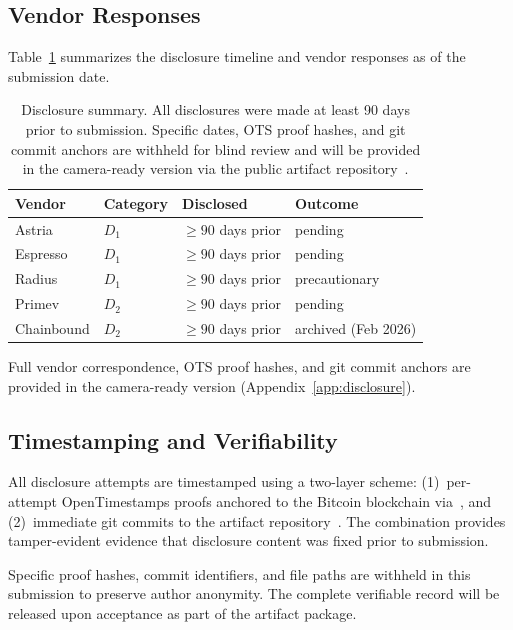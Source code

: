 \subsection{Vendor Responses}
\label{sec:disclosure-responses}

Table~\ref{tab:vendor-responses} summarizes the disclosure timeline and
vendor responses as of the submission date.

\begin{table}[h]
\centering
\small
\caption{Disclosure summary.
  All disclosures were made at least 90 days prior to submission.
  Specific dates, OTS proof hashes, and git commit anchors are
  withheld for blind review and will be provided in the camera-ready version
  via the public artifact repository~\cite{artifact-repo}.}
\label{tab:vendor-responses}
\begin{tabular}{@{}llll@{}}
\toprule
Vendor & Category & Disclosed & Outcome \\
\midrule
Astria       & $D_1$ & $\geq 90$ days prior & pending \\
Espresso     & $D_1$ & $\geq 90$ days prior & pending \\
Radius       & $D_1$ & $\geq 90$ days prior & precautionary \\
Primev       & $D_2$ & $\geq 90$ days prior & pending \\
Chainbound   & $D_2$ & $\geq 90$ days prior & archived (Feb 2026) \\
\bottomrule
\end{tabular}
\end{table}

\noindent Full vendor correspondence, OTS proof hashes, and git commit
anchors are provided in the camera-ready version (Appendix~\ref{app:disclosure}).

\subsection{Timestamping and Verifiability}
\label{sec:disclosure-timestamps}

All disclosure attempts are timestamped using a two-layer scheme:
(1)~per-attempt OpenTimestamps proofs anchored to the Bitcoin blockchain
via~\cite{opentimestamps}, and (2)~immediate git commits to the artifact
repository~\cite{artifact-repo}. The combination provides tamper-evident
evidence that disclosure content was fixed prior to submission.

Specific proof hashes, commit identifiers, and file paths are withheld
in this submission to preserve author anonymity. The complete verifiable
record will be released upon acceptance as part of the artifact package.

